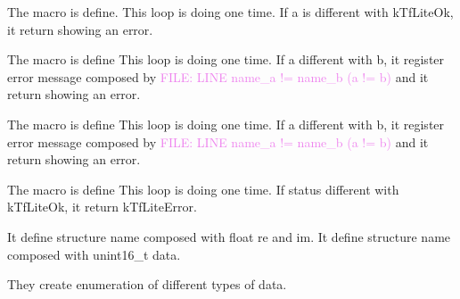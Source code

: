 \bigskip

The macro  is define. 
This loop is doing one time. If a is different with kTfLiteOk, it  return showing an error. 

\begin{center}
    \label{Figure:Comatibily}
\end{center}

The macro  is define 
This loop is doing one time. If a different with b, it register error message composed by \textcolor{violet}{FILE: LINE  name\_a != name\_b (a != b)} and it return showing an error. 

The macro  is define 
This loop is doing one time. If a different with b, it register error message composed by \textcolor{violet}{FILE: LINE  name\_a != name\_b (a != b)} and it return showing an error. 

The macro  is define 
This loop is doing one time. If status different with kTfLiteOk, it return kTfLiteError. 

\begin{center}
    \label{Figure:Comatibily}
\end{center}


It define structure name  composed with float re and im. 
It define structure name  composed with unint16\_t data.

They create enumeration of different types of data. 

